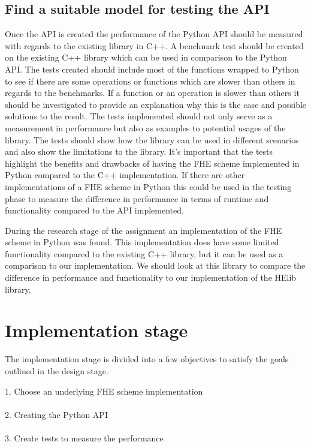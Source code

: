 \subsection{Find a suitable model for testing the API}
Once the API is created the performance of the Python API should be measured with regards to the existing library in C++. A benchmark test should be created on the existing C++ library which can be used in comparison to the Python API. The tests created should include most of the functions wrapped to Python to see if there are some operations or functions which are slower than others in regards to the benchmarks. If a function or an operation is slower than others it should be investigated to provide an explanation why this is the case and possible solutions to the result. The tests implemented should not only serve as a measurement in performance but also as examples to potential usages of the library. The tests should show how the library can be used in different scenarios and also show the limitations to the library. It's important that the tests highlight the benefits and drawbacks of having the FHE scheme implemented in Python compared to the C++ implementation. If there are other implementations of a FHE scheme in Python this could be used in the testing phase to measure the difference in performance in terms of runtime and functionality compared to the API implemented.

During the research stage of the assignment an implementation of the FHE scheme in Python was found. This implementation does have some limited functionality compared to the existing C++ library, but it can be used as a comparison to our implementation. We should look at this library to compare the difference in performance and functionality to our implementation of the HElib library.

\newpage
\section{Implementation stage}
The implementation stage is divided into a few objectives to satisfy the goals outlined in the design stage.


1. Choose an underlying FHE scheme implementation\\\\
2. Creating the Python API \\\\
3. Create tests to measure the performance \\\\


